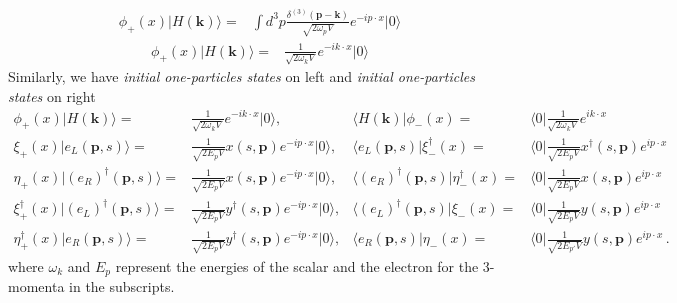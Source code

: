 \begin{align}
\phi_+(x)|H(\mathbf{k})\rangle  
=&\int d^3p \frac{\delta^{(3)}(\mathbf{p}-\mathbf{k})}{\sqrt{2\omega_{p}V}}
 e^{-i p\cdot x }|0\rangle
\end{align}
\begin{align}
\phi_+(x)|H(\mathbf{k})\rangle  
=&\frac{1}{\sqrt{2\omega_{k}V}}e^{-i k\cdot x }|0\rangle
\end{align}
Similarly, we have  \emph{initial one-particles states} on left and \emph{initial one-particles states} on right
\begin{align}
  \label{eq:99f}
  \phi_+(x)|H(\mathbf{k})\rangle=&\frac{1}{\sqrt{2 \omega_k V}}e^{-i k\cdot x}|0\rangle,&
 \langle H(\mathbf{k})|\phi_-(x)=&\langle0|\frac{1}{\sqrt{2 \omega_k V}}e^{i k\cdot x}\nonumber\\
  \xi_+(x)|e_{L}(\mathbf{p},s)\rangle=&\frac{1}{\sqrt{2 E_p V}}x(s,\mathbf{p})e^{-i p\cdot x}|0\rangle,&
  \langle e_{L}(\mathbf{p},s)|\xi_-^{\dagger}(x)=&\langle 0|\frac{1}{\sqrt{2 E_p V}}x^{\dagger}(s,\mathbf{p})e^{i p\cdot x}\nonumber\\
  \eta_+(x)|\left( e_R \right)^{\dagger}(\mathbf{p},s)\rangle=&\frac{1}{\sqrt{2 E_{p} V}}x(s,\mathbf{p})e^{-i p\cdot x}|0\rangle,&
  \langle \left( e_R \right)^{\dagger}(\mathbf{p},s)|\eta^{\dagger}_-(x)=&\langle 0|\frac{1}{\sqrt{2 E_{p} V}}x(s,\mathbf{p})e^{i p\cdot x} \nonumber\\
  \xi_+^{\dagger}(x)|\left( e_{L} \right)^{\dagger}(\mathbf{p},s)\rangle=&\frac{1}{\sqrt{2 E_p V}}y^{\dagger}(s,\mathbf{p})e^{-i p\cdot x}|0\rangle,&
  \langle\left( e_{L} \right)^{\dagger}(\mathbf{p},s)|\xi_-(x)=&\langle 0| \frac{1}{\sqrt{2 E_p V}}y(s,\mathbf{p})e^{i p\cdot x}\nonumber\\
  \eta_+^{\dagger}(x)|e_R (\mathbf{p},s)\rangle=&\frac{1}{\sqrt{2 E_{p} V}}y^{\dagger}(s,\mathbf{p})e^{-i p\cdot x}|0\rangle,&
  \langle e_R(\mathbf{p},s)|\eta_-(x)=&\langle 0|\frac{1}{\sqrt{2 E_{p'} V}}y(s,\mathbf{p})e^{i p\cdot x}
 \,.
\end{align}
where $\omega_k$ and $E_p$ represent the energies of the scalar and the electron for the 3-momenta in the subscripts.


